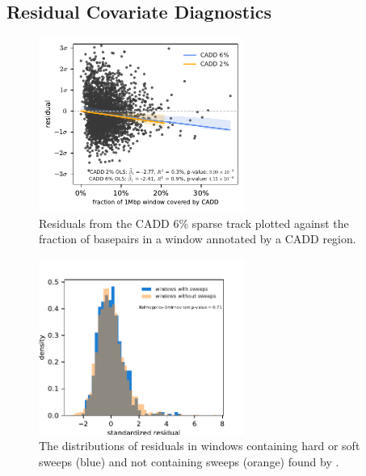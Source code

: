 \documentclass[11pt]{article}
\begin{document}
\subsection{Residual Covariate Diagnostics}

\begin{figure}[htbp]
  \label{suppfig:resid-cadd}
  \centering
  \includegraphics[width=0.6\textwidth]{figures/supplementary/cadd_residual.pdf}
  \caption{Residuals from the CADD 6\% sparse track plotted against the fraction of
  basepairs in a window annotated by a CADD region.}
\end{figure}

\begin{figure}[htbp]
  \label{suppfig:resid-sweeps}
  \centering
  \includegraphics[width=0.6\textwidth]{figures/supplementary/sweep_residuals.pdf}

  \caption{The distributions of residuals in windows containing hard or soft
  sweeps (blue) and not containing sweeps (orange) found by
\parencite{Schrider2017-yx}.}

\end{figure}
\end{document}

